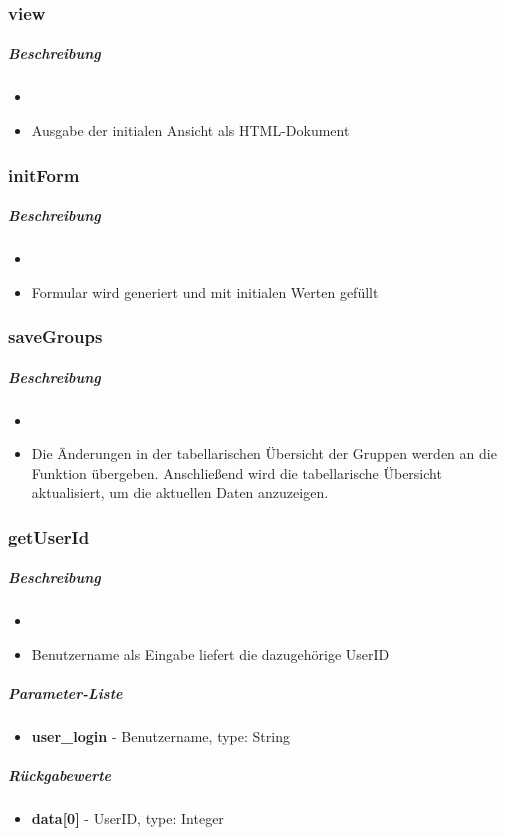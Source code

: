 \subsubsection*{view}\label{viewGDGUI}
\subparagraph{Beschreibung}
\begin{itemize}
	\item[] \noindent{}
	\item[] Ausgabe der initialen Ansicht als HTML-Dokument
\end{itemize}

\subsubsection*{initForm}\label{initFormGDGUI}
\subparagraph{Beschreibung}
\begin{itemize}
	\item[] \noindent{}
	\item[] Formular wird generiert und mit initialen Werten gefüllt
\end{itemize}

\subsubsection*{saveGroups}\label{saveGroupsGDGUI}
\subparagraph{Beschreibung}
\begin{itemize}
	\item[]  \noindent{} 
	\item[] Die Änderungen in der tabellarischen Übersicht der Gruppen werden an die Funktion  übergeben. Anschließend wird die tabellarische Übersicht aktualisiert, um die aktuellen Daten anzuzeigen.
\end{itemize}

\subsubsection*{getUserId}\label{getUserIdGDGUI}
\subparagraph{Beschreibung}
\begin{itemize}
	\item[]  \noindent{} 
	\item[] Benutzername als Eingabe liefert die dazugehörige UserID
\end{itemize}
\subparagraph{Parameter-Liste}
\begin{itemize}
	\item[] \textbf{user\_login} - Benutzername, type: String
\end{itemize}
\subparagraph{Rückgabewerte}
\begin{itemize}
	\item[] \textbf{data[0]} - UserID, type: Integer
\end{itemize}


